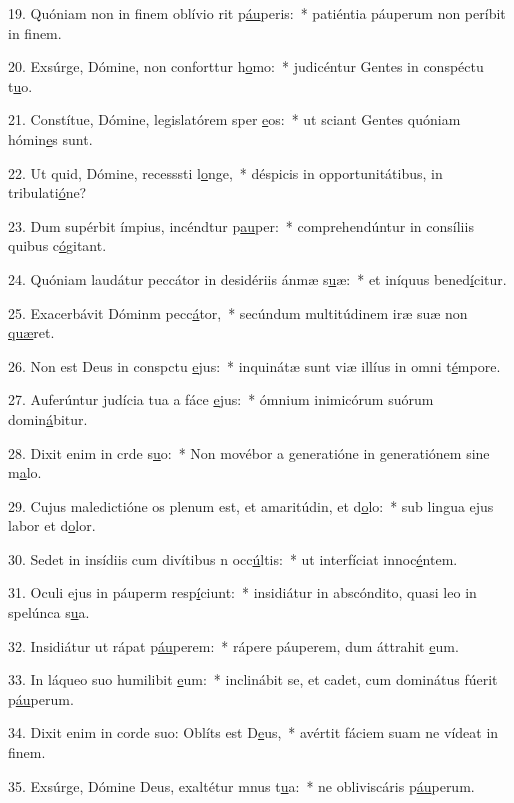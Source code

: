 19. Quóniam non in finem oblívio rit p\uline{áu}peris:~* patiéntia páuperum non períbit in f\uline{i}nem.\par 
20. Exsúrge, Dómine, non conforttur h\uline{o}mo:~* judicéntur Gentes in conspéctu t\uline{u}o.\par 
21. Constítue, Dómine, legislatórem sper \uline{e}os:~* ut sciant Gentes quóniam hómin\uline{e}s sunt.\par 
22. Ut quid, Dómine, recesssti l\uline{o}nge,~* déspicis in opportunitátibus, in tribulati\uline{ó}ne?\par 
23. Dum supérbit ímpius, incéndtur p\uline{au}per:~* comprehendúntur in consíliis quibus c\uline{ó}gitant.\par 
24. Quóniam laudátur peccátor in desidériis ánmæ s\uline{u}æ:~* et iníquus bened\uline{í}citur.\par 
25. Exacerbávit Dóminm pecc\uline{á}tor,~* secúndum multitúdinem iræ suæ non \uline{quæ}ret.\par 
26. Non est Deus in conspctu \uline{e}jus:~* inquinátæ sunt viæ illíus in omni t\uline{é}mpore.\par 
27. Auferúntur judícia tua a fáce \uline{e}jus:~* ómnium inimicórum suórum domin\uline{á}bitur.\par 
28. Dixit enim in crde s\uline{u}o:~* Non movébor a generatióne in generatiónem sine m\uline{a}lo.\par 
29. Cujus maledictióne os plenum est, et amaritúdin, et d\uline{o}lo:~* sub lingua ejus labor et d\uline{o}lor.\par 
30. Sedet in insídiis cum divítibus n occ\uline{ú}ltis:~* ut interfíciat innoc\uline{é}ntem.\par 
31. Oculi ejus in páuperm resp\uline{í}ciunt:~* insidiátur in abscóndito, quasi leo in spelúnca s\uline{u}a.\par 
32. Insidiátur ut rápat p\uline{áu}perem:~* rápere páuperem, dum áttrahit \uline{e}um.\par 
33. In láqueo suo humilibit \uline{e}um:~* inclinábit se, et cadet, cum dominátus fúerit p\uline{áu}perum.\par 
34. Dixit enim in corde suo: Oblíts est D\uline{e}us,~* avértit fáciem suam ne vídeat in f\uline{i}nem.\par 
35. Exsúrge, Dómine Deus, exaltétur mnus t\uline{u}a:~* ne obliviscáris p\uline{áu}perum.\par 
